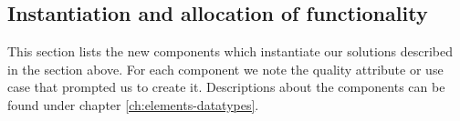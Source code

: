 
\subsection{Instantiation and allocation of functionality}
    This section lists the new components which instantiate our solutions
    described in the section above. For each component we note the quality
    attribute or use case that prompted us to create it. Descriptions about
    the components can be found under chapter \ref{ch:elements-datatypes}. \\

